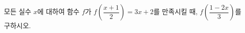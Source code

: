 모든 실수 $x$에 대하여 함수 $f$가 $f\!\left(\dfrac{x+1}{2}\right)=3x+2$를 만족시킬 때, $f\!\left(\dfrac{1-2x}{3}\right)$를 구하시오.

